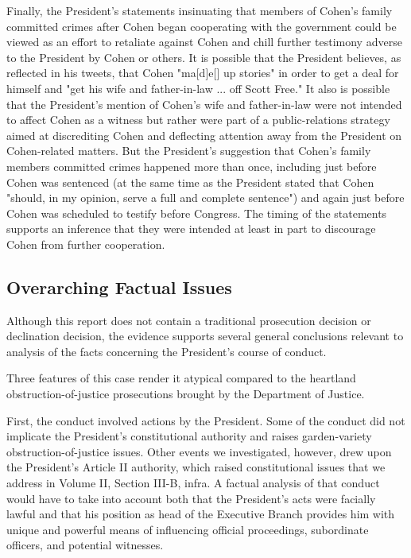 {Finally, the President's statements insinuating that members of Cohen's family committed crimes after Cohen began cooperating with the government could be viewed as an effort to retaliate against Cohen and chill further testimony adverse to the President by Cohen or others.
It is possible that the President believes, as reflected in his tweets, that Cohen "ma[d]e[] up stories" in order to get a deal for himself and "get his wife and father-in-law ... off Scott Free." It also is possible that the President's mention of Cohen's wife and father-in-law were not intended to affect Cohen as a witness but rather were part of a public-relations strategy aimed at discrediting Cohen and deflecting attention away from the President on Cohen-related matters.
But the President's suggestion that Cohen's family members committed crimes happened more than once, including just before Cohen was sentenced (at the same time as the President stated that Cohen "should, in my opinion, serve a full and complete sentence") and again just before Cohen was scheduled to testify before Congress.
The timing of the statements supports an inference that they were intended at least in part to discourage Cohen from further cooperation.

\subsection{Overarching Factual Issues}

Although this report does not contain a traditional prosecution decision or declination decision, the evidence supports several general conclusions relevant to analysis of the facts concerning the President's course of conduct.

Three features of this case render it atypical compared to the heartland obstruction-of-justice prosecutions brought by the Department of Justice.

First, the conduct involved actions by the President.
Some of the conduct did not implicate the President's constitutional authority and raises garden-variety obstruction-of-justice issues.
Other events we investigated, however, drew upon the President's Article II authority, which raised constitutional issues that we address in Volume II, Section III-B, infra.
A factual analysis of that conduct would have to take into account both that the President's acts were facially lawful and that his position as head of the Executive Branch provides him with unique and powerful means of influencing official proceedings, subordinate officers, and potential witnesses.

}
